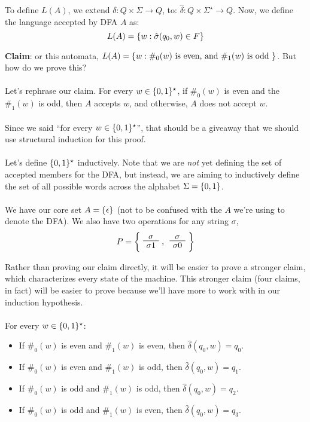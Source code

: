 \documentclass[]{article}
\DeclarePairedDelimiter{\set}{\lbrace}{\rbrace}
\theoremstyle{definition}
\begin{document}
      To define $L(A)$, we extend $\delta: Q \times \Sigma \to Q$, to: $\hat{\delta}: Q \times \Sigma^\star \to Q$. Now, we define the language accepted by DFA $A$ as:
      $$
        L(A) = \set{ w : \hat{\sigma}(q_0, w) \in F }
      $$

      \textbf{Claim}: or this automata, $L(A) = \set{ w : \#_0(w) \text{ is even, and } \#_1(w) \text{ is odd }}$. But how do we prove this?
      \\ \\
      Let's rephrase our claim. For every $w \in \set{0, 1}^\star$, if $\#_0(w)$ is even and the $\#_1(w)$ is odd, then $A$ accepts $w$, and otherwise, $A$ does not accept $w$.
      \\ \\
      Since we said ``for every $w \in \set{0, 1}^\star$'', that should be a giveaway that we should use structural induction for this proof.
      \\ \\
      Let's define $\set{0, 1}^\star$ inductively. Note that we are \emph{not} yet defining the set of accepted members for the DFA, but instead, we are aiming to inductively define the set of all possible words across the alphabet $\Sigma = \set{0, 1}$.
      \\ \\
      We have our core set $A = \set{ \epsilon }$ (not to be confused with the $A$ we're using to denote the DFA). We also have two operations for any string $\sigma$,
      $$
        P = \bigg\{ \text{\AxiomC{$\sigma$} \UnaryInfC{$\sigma 1$} \DisplayProof, \AxiomC{$\sigma$} \UnaryInfC{$\sigma 0$} \DisplayProof} \bigg\}
      $$

      Rather than proving our claim directly, it will be easier to prove a stronger claim, which characterizes every state of the machine. This stronger claim (four claims, in fact) will be easier to prove because we'll have more to work with in our induction hypothesis.
      \\ \\
      For every $w \in \set{0, 1}^\star$:

      \begin{itemize}
        \item If $\#_0(w)$ is even and $\#_1(w)$ is even, then $\hat{\delta}(q_0, w) = q_0$.
        \item If $\#_0(w)$ is even and $\#_1(w)$ is odd, then $\hat{\delta}(q_0, w) = q_1$.
        \item If $\#_0(w)$ is odd and $\#_1(w)$ is odd, then $\hat{\delta}(q_0, w) = q_2$.
        \item If $\#_0(w)$ is odd and $\#_1(w)$ is even, then $\hat{\delta}(q_0, w) = q_3$.
      \end{itemize}
\end{document}
